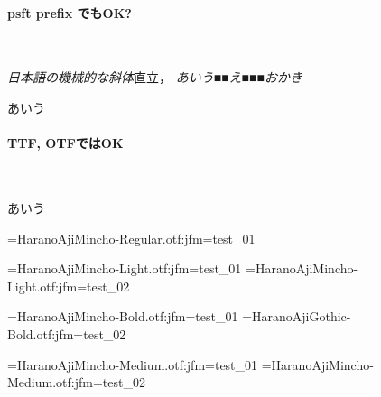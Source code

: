 \documentclass{ltjsarticle}
\begin{document}

\paragraph{psft prefix でもOK?}\ 

\textsl{日本語の機械的な斜体}直立，
\textsl{あいう■\textup{■え■■}■おかき}

{\selectfont あいう}

\paragraph{TTF, OTFではOK}\ 


{\selectfont あいう}


\makeatletter
{}
\jfont\a=HaranoAjiMincho-Regular.otf:jfm=test_01

\jfont\a=HaranoAjiMincho-Light.otf:jfm=test_01
\jfont\az=HaranoAjiMincho-Light.otf:jfm=test_02

\jfont\aw=HaranoAjiMincho-Bold.otf:jfm=test_01
\jfont\as=HaranoAjiGothic-Bold.otf:jfm=test_02

\jfont\ar=HaranoAjiMincho-Medium.otf:jfm=test_01
\jfont\af=HaranoAjiMincho-Medium.otf:jfm=test_02
\end{document}

